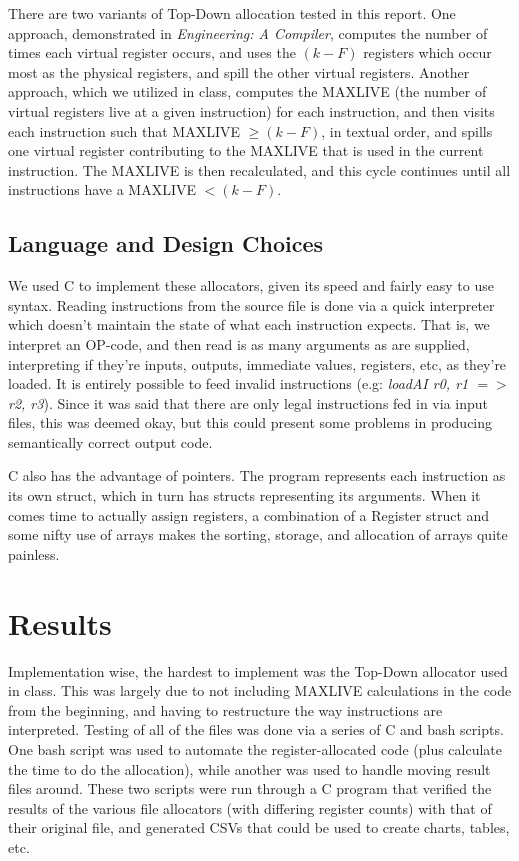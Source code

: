 \documentclass[answers]{exam}
\begin{document}
		There are two variants of Top-Down allocation tested in this report. One approach, demonstrated in \textit{Engineering: A Compiler}, computes the number of times each virtual register occurs, and uses the $(k-F)$ registers which occur most as the physical registers, and spill the other virtual registers. Another approach, which we utilized in class, computes the MAXLIVE (the number of virtual registers live at a given instruction) for each instruction, and then visits each instruction such that MAXLIVE $ \geq (k-F)$, in textual order, and spills one virtual register contributing to the MAXLIVE that is used in the current instruction. The MAXLIVE is then recalculated, and this cycle continues until all instructions have a MAXLIVE $< (k-F)$.
	
	\subsection{Language and Design Choices}
		We used C to implement these allocators, given its speed and fairly easy to use syntax. Reading instructions from the source file is done via a quick interpreter which doesn't maintain the state of what each instruction expects. That is, we interpret an OP-code, and then read is as many arguments as are supplied, interpreting if they're inputs, outputs, immediate values, registers, etc, as they're loaded. It is entirely possible to feed invalid instructions (e.g: \textit{loadAI r0, r1 $=>$ r2, r3}). Since it was said that there are only legal instructions fed in via input files, this was deemed okay, but this could present some problems in producing semantically correct output code.
		
		C also has the advantage of pointers. The program represents each instruction as its own struct, which in turn has structs representing its arguments. When it comes time to actually assign registers, a combination of a Register struct and some nifty use of arrays makes the sorting, storage, and allocation of arrays quite painless.
		
	\section{Results}
		Implementation wise, the hardest to implement was the Top-Down allocator used in class. This was largely due to not including MAXLIVE calculations in the code from the beginning, and having to restructure the way instructions are interpreted. Testing of all of the files was done via a series of C and bash scripts. One bash script was used to automate the register-allocated code (plus calculate the time to do the allocation), while another was used to handle moving result files around. These two scripts were run through a C program that verified the results of the various file allocators (with differing register counts) with that of their original file, and generated CSVs that could be used to create charts, tables, etc.
		
\end{document}
